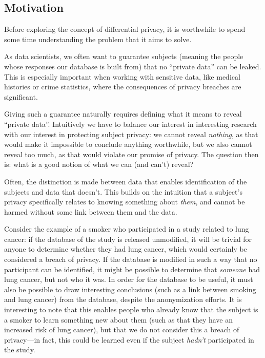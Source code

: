 \documentclass[a4paper,12pt]{article}
\begin{document}
\subsection{Motivation \label{sec:motivation}}

Before exploring the concept of differential privacy, it is worthwhile to spend some time understanding the problem that it aims to solve.

As data scientists, we often want to guarantee subjects (meaning the people whose responses our database is built from) that no ``private data'' can be leaked. This is especially important when working with sensitive data, like medical histories or crime statistics, where the consequences of privacy breaches are significant.

Giving such a guarantee naturally requires defining what it means to reveal ``private data''. Intuitively we have to balance our interest in interesting research with our interest in protecting subject privacy: we cannot reveal \emph{nothing}, as that would make it impossible to conclude anything worthwhile, but we also cannot reveal too much, as that would violate our promise of privacy. The question then is: what is a good notion of what we can (and can't) reveal?

Often, the distinction is made between data that enables identification of the subjects and data that doesn't. This builds on the intuition that a subject's privacy specifically relates to knowing something about \emph{them}, and cannot be harmed without some link between them and the data.

Consider the example of a smoker who participated in a study related to lung cancer: if the database of the study is released unmodified, it will be trivial for anyone to determine whether they had lung cancer, which would certainly be considered a breach of privacy. If the database is modified in such a way that no participant can be identified, it might be possible to determine that \emph{someone} had lung cancer, but not who it was. In order for the database to be useful, it must also be possible to draw interesting conclusions (such as a link between smoking and lung cancer) from the database, despite the anonymization efforts. It is interesting to note that this enables people who already know that the subject is a smoker to learn something new about them (such as that they have an increased risk of lung cancer), but that we do not consider this a breach of privacy---in fact, this could be learned even if the subject \emph{hadn't} participated in the study.
\end{document}

